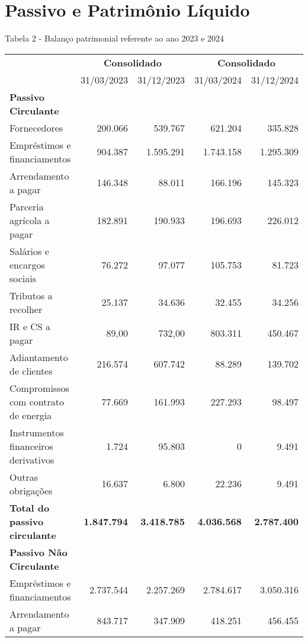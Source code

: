 \documentclass[1pt,a4paper]{article}
\begin{document}
		
		\newpage
		\centering\section*{Passivo e Patrimônio Líquido}
		Tabela 2 - Balanço patrimonial referente ao ano 2023 e 2024
		\begin{longtable}{p{6cm} r r r r}
			\toprule
			& \multicolumn{2}{c}{\textbf{Consolidado}} & \multicolumn{2}{c}{\textbf{Consolidado}} \\
			\cmidrule(lr){2-3} \cmidrule(lr){4-5}
			& 31/03/2023 & 31/12/2023 & 31/03/2024 & 31/12/2024 \\
			\midrule
			\endhead
			\textbf{Passivo Circulante} & & & & \\
			Fornecedores & 200.066 & 539.767 & 621.204 & 335.828 \\
			Empréstimos e financiamentos & 904.387 & 1.595.291 & 1.743.158 & 1.295.309 \\
			Arrendamento a pagar & 146.348 & 88.011 & 166.196 & 145.323 \\
			Parceria agrícola a pagar & 182.891 & 190.933 & 196.693 & 226.012 \\
			Salários e encargos sociais & 76.272 & 97.077 & 105.753 & 81.723 \\
			Tributos a recolher & 25.137 & 34.636 & 32.455 & 34.256 \\
			IR e CS a pagar & 89,00 & 732,00 & 803.311 & 450.467 \\
			Adiantamento de clientes & 216.574 & 607.742 & 88.289 & 139.702 \\
			Compromissos com contrato de energia & 77.669 & 161.993 & 227.293 & 98.497 \\
			Instrumentos financeiros derivativos & 1.724 & 95.803 & 0 & 9.491 \\
			Outras obrigações & 16.637 & 6.800 & 22.236 & 9.491 \\
			\rowcolor{darkgray}\textbf{Total do passivo circulante} & \textbf{1.847.794} & \textbf{3.418.785} & \textbf{4.036.568} & \textbf{2.787.400} \\
			\midrule
			\textbf{Passivo Não Circulante} & & & & \\
			Empréstimos e financiamentos & 2.737.544 & 2.257.269 & 2.784.617 & 3.050.316 \\
			Arrendamento a pagar & 843.717 & 347.909 & 418.251 & 456.455 \\

\end{longtable}
\end{document}
